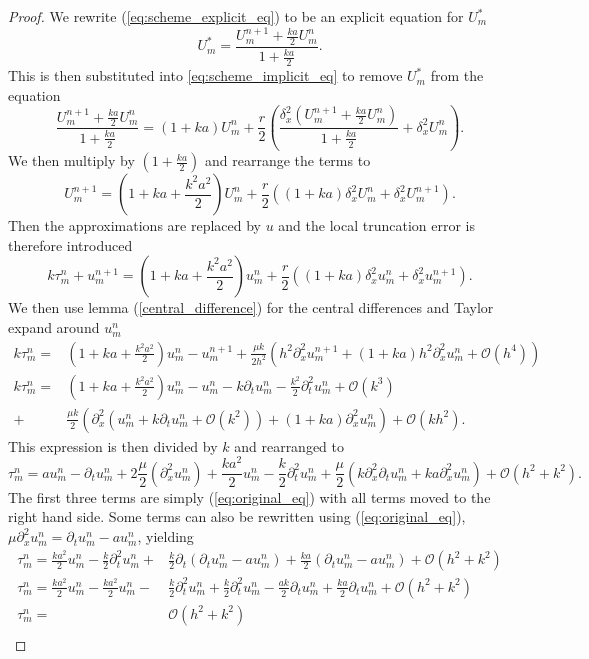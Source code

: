 \begin{proof}
    We rewrite (\ref{eq:scheme_explicit_eq}) to be an explicit equation for $U_m^*$
    $$ U_{m}^{*}= \frac{U_{m}^{n+1}+\frac{ka}{2}U_{m}^{n}}{1+\frac{ka}{2}}.$$
    This is then substituted into \ref{eq:scheme_implicit_eq} to remove $U_{m}^{*}$ from the equation
    $$\frac{U_{m}^{n+1}+\frac{ka}{2}U_{m}^{n}}{1+\frac{ka}{2}} = (1+ka)U_{m}^{n}+\frac{r}{2}\left( \frac{\delta_x^2(U_{m}^{n+1}+\frac{ka}{2}U_{m}^{n})}{1+\frac{ka}{2}}  + \delta_x^2 U_{m}^{n}\right).$$
    We then multiply by $(1+\frac{ka}{2})$ and rearrange the terms to
    $$ U_{m}^{n+1}=(1+ ka + \frac{k^2a^2}{2})U_{m}^{n} + \frac{r}{2}\left((1+ka)\delta_x^2U_{m}^{n} +\delta_x^2U_{m}^{n+1}\right).$$
    Then the approximations are replaced by $u$ and the local truncation error is therefore introduced
    $$ k\tau_m^n + u_{m}^{n+1} = (1+ ka + \frac{k^2a^2}{2})u_{m}^{n} + \frac{r}{2}\left((1+ka)\delta_x^2u_{m}^{n} +\delta_x^2u_{m}^{n+1}\right).$$
    We then use lemma (\ref{central_difference}) for the central differences and Taylor expand around $u_{m}^{n}$
    \begin{align*}
        k \tau_m^n =& \left( 1 + ka +\frac{k^2a^2}{2}\right)u_{m}^{n} - u_{m}^{n+1}+\frac{\mu k}{2h^2} \left(h^2\partial_x^2 u_{m}^{n+1} + \left( 1+ka \right) h^2 \partial_x^2u_{m}^{n} + \mathcal{O}(h^4)\right) \\
        k \tau_m^n =& \left( 1 + ka + \frac{k^2a^2}{2}\right)u_{m}^{n} - u_{m}^{n} - k \partial_tu_{m}^{n} - \frac{k^2}{2} \partial_t^2 u_{m}^{n} + \mathcal{O}(k^3)  \\
        +& \frac{\mu k}{2}\left( \partial_x^2 \left( u_{m}^{n} + k \partial_t u_{m}^{n} + \mathcal{O}(k^2)\right) + \left( 1 + ka\right) \partial_x^2  u_{m}^{n} \right) + \mathcal{O}(kh^2).
    \end{align*}
    This expression is then divided by $k$ and rearranged to 
    $$\tau_m^n = a u_{m}^{n} - \partial_tu_{m}^{n} + 2 \frac{\mu}{2}\left( \partial_x^2 u_{m}^{n}\right) +  \frac{ka^2}{2}u_{m}^{n}  - \frac{k}{2} \partial_t^2 u_{m}^{n} + \frac{\mu }{2}\left( k \partial_x^2 \partial_t u_{m}^{n}  + ka \partial_x^2  u_{m}^{n} \right) + \mathcal{O}(h^2 + k^2).$$
    The first three terms are simply (\ref{eq:original_eq}) with all terms moved to the right hand side. Some terms can also be rewritten using (\ref{eq:original_eq}), $\mu \partial_x^2u_{m}^{n} = \partial_t u_{m}^{n} - au_{m}^{n}$, yielding
    \begin{align*}
        \tau_m^n = \frac{ka^2}{2}u_{m}^{n}  - \frac{k}{2} \partial_t^2 u_{m}^{n} +& \frac{k}{2} \partial_t \left(\partial_t u_{m}^{n}   - au_{m}^{n} \right) + \frac{ka}{2} \left( \partial_t  u_{m}^{n} - a u_{m}^{n}\right)+ \mathcal{O}(h^2 + k^2) \\
        \tau_m^n = \frac{ka^2}{2}u_{m}^{n} - \frac{ka^2}{2}u_{m}^{n}  -& \frac{k}{2} \partial_t^2 u_{m}^{n} + \frac{k}{2} \partial_t^2 u_{m}^{n} - \frac{ak}{2} \partial_t u_{m}^{n} + \frac{ka}{2} \partial_t  u_{m}^{n}+ \mathcal{O}(h^2 + k^2) \\
        \tau_m^n =& \mathcal{O}(h^2 + k^2) \\
    \end{align*}
\end{proof}
